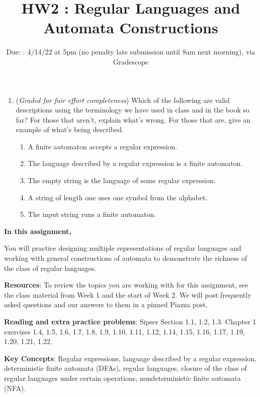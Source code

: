 \begin{enumerate}
\item ({\it Graded for fair effort completeness})
Which of the following are valid descriptions using the terminology we have used in 
class and in the book so far? For those that aren't, explain what's wrong. For those that are, 
give an example of what's being described.
\begin{enumerate}
\item A finite automaton accepts a regular expression.
\item The language described by a regular expression is a finite automaton.
\item The empty string is the language of some regular expression.
\item A string of length one uses one symbol from the alphabet.
\item The input string runs a finite automaton.
\end{enumerate}


\end{enumerate}
\newpage

\title{HW2 : Regular Languages and Automata Constructions}
\date{Due: : 4/14/22 at 5pm (no penalty late submission until 8am next morning), via Gradescope}


\maketitle
\thispagestyle{fancy}


{\bf In this assignment,}

You will practice designing multiple representations of regular languages
and working with general constructions of automata to demonstrate the 
richness of the class of regular languages.

{\bf Resources}: To review the topics you are working with 
for this assignment, see the class material from  Week 1 and the start of Week 2.
We will post frequently asked questions and our answers to them in a 
pinned Piazza post.

{\bf Reading and extra practice problems}: Sipser Section 1.1, 1.2, 1.3.
Chapter 1 exercises 1.4, 1.5, 1.6, 1.7, 1.8, 1.9, 1.10, 1.11, 1.12, 1.14, 1.15, 1.16, 1.17, 1.19, 1.20, 1.21, 1.22.

{\bf Key Concepts}: Regular expressions, language described by a regular expression, deterministic finite automata (DFAs), 
regular languages, closure of the class of regular languages under certain operations, 
nondeterministic finite automata (NFA).


